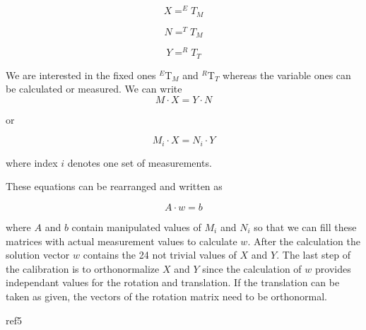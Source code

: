 \begin{equation}
	X = ^ET_M
\end{equation}
	
\begin{equation}
	N = ^TT_M
\end{equation}
	
\begin{equation}
	Y = ^RT_T
\end{equation}

We are interested in the fixed ones $^E$T$_M$ and $^R$T$_T$ whereas the variable ones can be calculated or measured. We can write \\

\begin{equation}
	M \cdot X = Y \cdot N
\end{equation}

or 

\begin{equation}
	M_i \cdot X = N_i \cdot Y
\end{equation}

where index $i$ denotes one set of measurements. 

These equations can be rearranged and written as 

\begin{equation}
	A \cdot w = b
\end{equation}

where $A$ and $b$ contain manipulated values of $M_i$ and $N_i$ so that we can fill these matrices with 
actual measurement values to calculate $w$. After the calculation the solution vector $w$ contains the
24 not trivial values of $X$ and $Y$. The last step of the calibration is to orthonormalize $X$ and $Y$
since the calculation of $w$ provides independant values for the rotation and translation. 
If the translation can be taken as given, the vectors of the rotation matrix need to be orthonormal.  

ref5     
	
	
	

